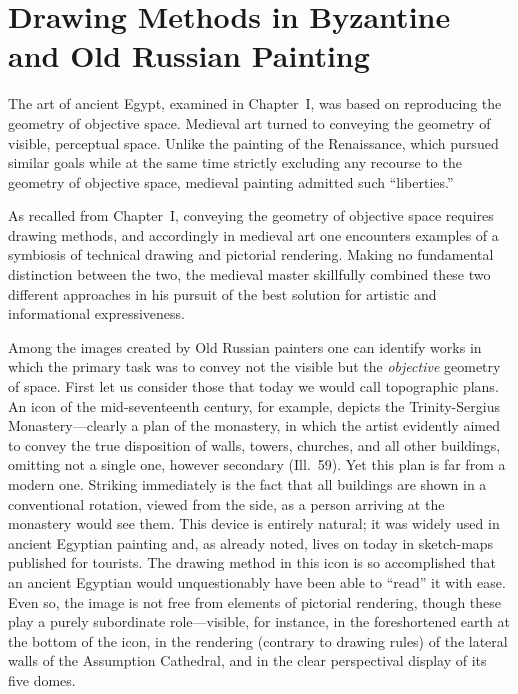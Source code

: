 
\chapter{Drawing Methods in Byzantine and Old Russian Painting}



The art of ancient Egypt, examined in Chapter~I, was based on reproducing the geometry
of objective space.  Medieval art turned to conveying the geometry of visible, perceptual
space.  Unlike the painting of the Renaissance, which pursued similar goals while at the
same time strictly excluding any recourse to the geometry of objective space, medieval
painting admitted such ``liberties.''

As recalled from Chapter~I, conveying the geometry of objective space requires drawing
methods, and accordingly in medieval art one encounters examples of a symbiosis of
technical drawing and pictorial rendering.  Making no fundamental distinction between the
two, the medieval master skillfully combined these two different approaches in his pursuit
of the best solution for artistic and informational expressiveness.

Among the images created by Old Russian painters one can identify works in which the
primary task was to convey not the visible but the \emph{objective} geometry of space.
First let us consider those that today we would call topographic plans.  An icon of the
mid-seventeenth century, for example, depicts the Trinity-Sergius Monastery---clearly a
plan of the monastery, in which the artist evidently aimed to convey the true disposition
of walls, towers, churches, and all other buildings, omitting not a single one, however
secondary (Ill.~59).  Yet this plan is far from a modern one.  Striking immediately is the
fact that all buildings are shown in a conventional rotation, viewed from the side, as a
person arriving at the monastery would see them.  This device is entirely natural; it was
widely used in ancient Egyptian painting and, as already noted, lives on today in sketch-maps
published for tourists.  The drawing method in this icon is so accomplished that an ancient
Egyptian would unquestionably have been able to ``read'' it with ease.  Even so, the image
is not free from elements of pictorial rendering, though these play a purely subordinate
role---visible, for instance, in the foreshortened earth at the bottom of the icon, in
the rendering (contrary to drawing rules) of the lateral walls of the Assumption Cathedral,
and in the clear perspectival display of its five domes.

